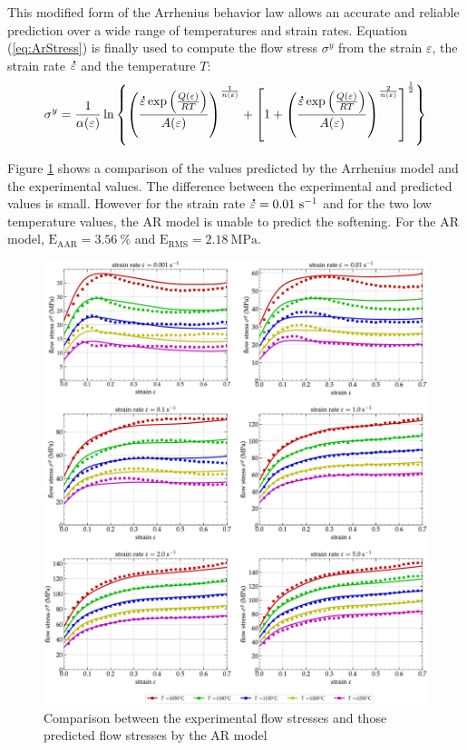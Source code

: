 \documentclass[twoside,english,1p,final,sort&compress]{elsarticle}
\theoremstyle{plain}
\DeclareRobustCommand{\mdot}[1]{\accentset{\mbox{\bfseries .}}{#1}}
\DeclareRobustCommand{\RMSE}{\text{E}_\text{RMS}}
\DeclareRobustCommand{\AARE}{\text{E}_\text{AAR}}
\DeclareRobustCommand{\ps}{\text{s}^{-1}}
\DeclareRobustCommand{\MPa}{\text{MPa}}
\begin{document}
This modified form of the Arrhenius behavior law allows an accurate and reliable prediction over a wide range of temperatures and strain rates.
Equation (\ref{eq:ArStress}) is finally used to compute the flow stress $\sigma^y$ from the strain $\varepsilon$, the strain rate $\mdot\varepsilon$ and the temperature $T$:
\begin{equation}
\sigma^y = \frac{1}{\alpha(\varepsilon)} \ln\left\{\left(\frac{\mdot\varepsilon \exp{\left(\frac{Q(\varepsilon)}{RT}\right)}}{A(\varepsilon)}\right)^{\frac{1}{n(\varepsilon)}} + \left[1 + \left(\frac{\mdot\varepsilon \exp{\left(\frac{Q(\varepsilon)}{RT}\right)}}{A(\varepsilon)}\right)^{\frac{2}{n(\varepsilon)}}\right]^{\frac{1}{2}}\right\}
\label{eq:ArStress}
\end{equation}

Figure \ref{fig:CompExp-AR-6} shows a comparison of the values predicted by the Arrhenius model and the experimental values. The difference between the experimental and predicted values is small. However for the strain rate $\mdot\varepsilon = 0.01~\ps$ and for the two low temperature values, the AR model is unable to predict the softening. For the AR model, $\AARE=3.56~\%$ and $\RMSE=2.18~\MPa$.
\begin{figure}[!ht]
\centering
\includegraphics[width=\columnwidth]
{Figures/CompExp-AR-6}
\caption{Comparison between the experimental flow stresses and those predicted flow stresses by the AR model}
\label{fig:CompExp-AR-6}
\end{figure}
\end{document}
